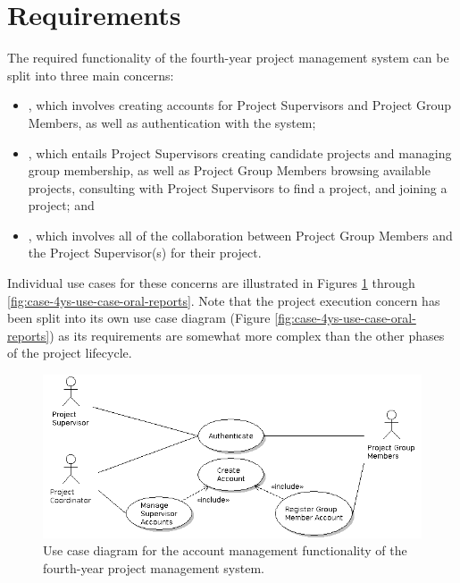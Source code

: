 \documentclass[document.tex]{subfiles}
\begin{document}
\section {Requirements}
\label {sec:4ys-requirements}
The required functionality of the fourth-year project management system can be split into three main concerns:
\begin{itemize}
\item {}, which involves creating accounts for Project Supervisors and Project Group Members, as well as authentication with the system;
\item {}, which entails Project Supervisors creating candidate projects and managing group membership, as well as Project Group Members browsing available projects, consulting with Project Supervisors to find a project, and joining a project; and
\item {}, which involves all of the collaboration between Project Group Members and the Project Supervisor(s) for their project.
\end{itemize}

Individual use cases for these concerns are illustrated in Figures \ref{fig:case-4ys-use-case-account-management} through \ref{fig:case-4ys-use-case-oral-reports}. Note that the project execution concern has been split into its own use case diagram (Figure \ref{fig:case-4ys-use-case-oral-reports}) as its requirements are somewhat more complex than the other phases of the project lifecycle.

\begin{figure}[!ht]
\centering \includegraphics[width=6in]{./img/case-study-fourth-year-system/setup-and-provisioning}
\caption{Use case diagram for the account management functionality of the fourth-year project management system.}
\label{fig:case-4ys-use-case-account-management}
\end{figure}
\end{document}
